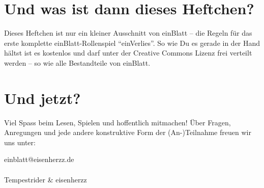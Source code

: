 \section {Und was ist dann dieses Heftchen?}
Dieses Heftchen ist nur ein kleiner Ausschnitt von einBlatt -- die Regeln für das erste komplette einBlatt-Rollenspiel "`einVerlies"'. So wie Du es gerade in der Hand hältst ist es kostenlos und darf unter der Creative Commons Lizenz frei verteilt werden -- so wie alle Bestandteile von einBlatt. 

\section {Und jetzt?}
Viel Spass beim Lesen, Spielen und hoffentlich mitmachen! Über Fragen, Anregungen und jede andere konstruktive Form der (An-)Teilnahme freuen wir uns unter:

einblatt@eisenherzz.de
\\
\\
Tempestrider \& eisenherzz
